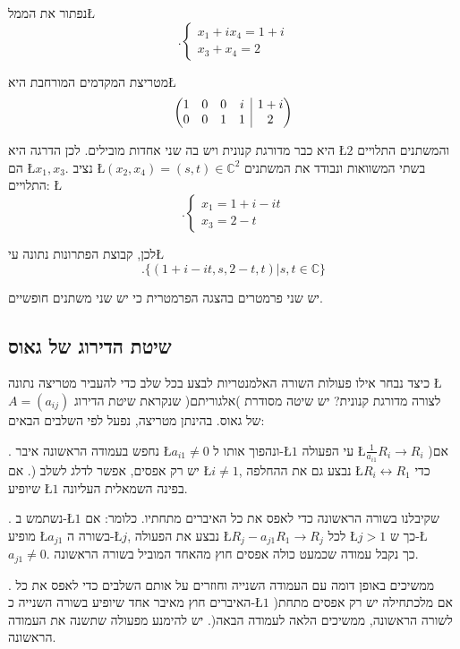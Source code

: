 \begin{example}
נפתור את הממ\textquotedbl ל\L{%
\[
.\begin{cases}
x_{1}+ix_{4}=1+i\\
x_{3}+x_{4}=2
\end{cases}
\]
}%

מטריצת המקדמים המורחבת היא\L{%
\[
\left( \begin{array}{@{}cccc|c@{}}
	1 & 0 & 0 & i & 1+i\\
	0 & 0 & 1 & 1 & 2
\end{array} \right)
\]
}%

היא כבר מדורגת קנונית ויש בה שני אחדות מובילים. לכן הדרגה היא \L{$2$}
והמשתנים התלויים הם \L{$x_{1},x_{3}$}. נציב \L{$(x_{2},x_{4})=(s,t)\in\mathbb{C}^{2}$}
בשתי המשוואות ונבודד את המשתנים התלויים: \L{%
\[
.\begin{cases}
x_{1}=1+i-it\\
x_{3}=2-t
\end{cases}
\]
}%

לכן, קבוצת הפתרונות נתונה ע\textquotedbl י\L{%
\[
.\{(1+i-it,s,2-t,t)|s,t\in\mathbb{C}\}
\]
}%

יש שני פרמטרים בהצגה הפרמטרית כי יש שני משתנים חופשיים.
\end{example}

\subsection{שיטת הדירוג של גאוס}

כיצד נבחר אילו פעולות השורה האלמנטריות לבצע בכל שלב כדי להעביר מטריצה
נתונה \L{$A=(a_{ij})$} לצורה מדורגת קנונית? יש שיטה מסודרת )אלגוריתם(
שנקראת שיטת הדירוג של גאוס. בהינתן מטריצה, נפעל לפי השלבים הבאים:

{\endL}. נחפש בעמודה הראשונה איבר \L{$a_{i1}\neq0$} ונהפוך
אותו ל-\L{$1$} ע\textquotedbl י הפעולה \L{$\frac{1}{a_{i1}}R_{i}\to R_{i}$}
)אם יש רק אפסים, אפשר לדלג לשלב {\endL}(. אם \L{$i\neq1$},
נבצע גם את ההחלפה \L{$R_{i}\leftrightarrow R_{1}$} כדי שיופיע \L{$1$}
בפינה השמאלית העליונה.

{\endL}. נשתמש ב-\L{$1$} שקיבלנו בשורה הראשונה כדי לאפס
את כל האיברים מתחתיו. כלומר: אם מופיע \L{$a_{j1}$} בשורה ה-\L{$j$},
נבצע את הפעולה \L{$R_{j}-a_{j1}R_{1}\to R_{j}$} לכל \L{$j>1$} כך
ש-\L{$a_{j1}\neq0$}. כך נקבל עמודה שכמעט כולה אפסים חוץ מהאחד המוביל
בשורה הראשונה.

{\endL}. ממשיכים באופן דומה עם העמודה השנייה וחוזרים על אותם
השלבים כדי לאפס את כל האיברים חוץ מאיבר אחד שיופיע בשורה השנייה כ-\L{$1$}
)אם מלכתחילה יש רק אפסים מתחת לשורה הראשונה, ממשיכים הלאה לעמודה הבאה(.
יש להימנע מפעולה שתשנה את העמודה הראשונה.

